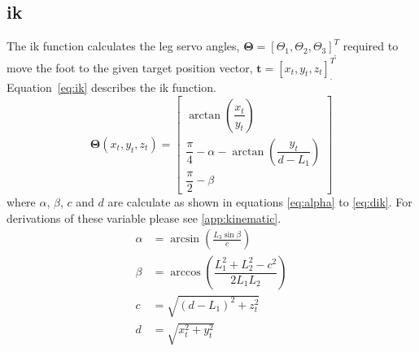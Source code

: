         \subsection{\acf{ik}}
            The \ac{ik} function calculates the leg servo angles, \(\bm{\Theta} = [\Theta_1, \Theta_2, \Theta_3]^T_{\displaystyle ,}\) required
            to move the foot to the given target position vector, \(\bm{t} = [x_t,y_t,z_t]^T_{\displaystyle .}\)
            \hbox{Equation \ref{eq:ik}} describes the \ac{ik} function.
            \begin{equation}\label{eq:ik}
                \bm{\Theta}(x_t,y_t,z_t) =
                                    \begin{bmatrix}
                                        \arctan{\left(\dfrac{x_t}{y_t}\right)}\\[0.5cm]
                                        \dfrac{\pi}{4} - \alpha - \arctan{\left(\dfrac{y_t}{d-L_1}\right)}\\[0.5cm]
                                        \dfrac{\pi}{2} - \beta
                                    \end{bmatrix}
            \end{equation}
            where \(\alpha\), \(\beta\), \(c\) and \(d\) are calculate as shown in equations \ref{eq:alpha} to \ref{eq:dik}. For derivations of these variable
            please see \ref{app:kinematic}.
            \begin{align}
                \alpha &= \arcsin{\left(\frac{L_3\sin{\beta}}{c}\right)} \label{eq:alpha} \\[0.5cm]
                \beta &= \arccos{\left(\dfrac{L_1^2 + L_2^2 -c^2}{2L_1L_2}\right)}\\[0.5cm]
                c &= \sqrt{(d-L_1)^2+z_t^2}\\[0.5cm]
                d &= \sqrt{x_t^2 + y_t^2} \label{eq:dik}
            \end{align}
